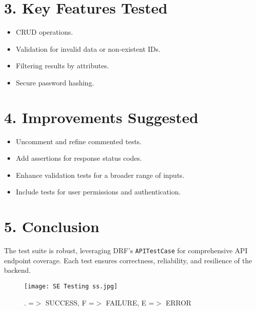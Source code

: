 \documentclass[12pt]{article}
\begin{document}
\section*{3. Key Features Tested}
\begin{itemize}
    \item CRUD operations.
    \item Validation for invalid data or non-existent IDs.
    \item Filtering results by attributes.
    \item Secure password hashing.
\end{itemize}

\section*{4. Improvements Suggested}
\begin{itemize}
    \item Uncomment and refine commented tests.
    \item Add assertions for response status codes.
    \item Enhance validation tests for a broader range of inputs.
    \item Include tests for user permissions and authentication.
\end{itemize}

\section*{5. Conclusion}
The test suite is robust, leveraging DRF's \texttt{APITestCase} for comprehensive API endpoint coverage. Each test ensures correctness, reliability, and resilience of the backend.

\begin{figure}[h]
    \centering
    \texttt{[image: SE Testing ss.jpg]}
    \caption{. =$>$ SUCCESS, F =$>$ FAILURE, E =$>$ ERROR}
    \label{fig:example_image}
\end{figure}
\end{document}
